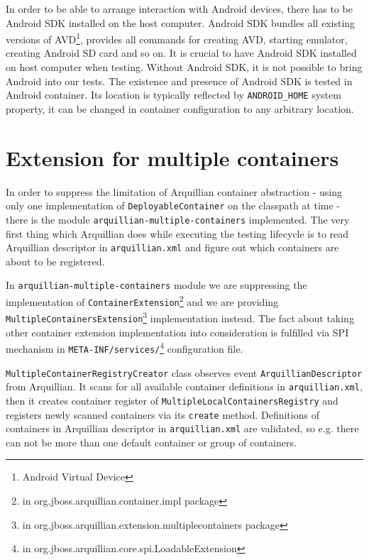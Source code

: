 \documentclass[12pt,final,oneside]{fithesis}
\begin{document}
In order to be able to arrange interaction with Android devices, there has to be Android SDK installed on the host computer. Android SDK bundles all existing versions of AVD\footnote{Android Virtual Device}, provides all commands for creating AVD, starting emulator, creating Android SD card and so on. It is crucial to have Android SDK installed on host computer when testing. Without Android SDK, it is not possible to bring Android into our tests. The existence and presence of Android SDK is tested in Android container. Its location is typically reflected by \texttt{ANDROID\_HOME} system property, it can be changed in container configuration to any arbitrary location.

	\section{Extension for multiple containers}

In order to suppress the limitation of Arquillian container abstraction - using only one implementation of \texttt{DeployableContainer} on the classpath at time - there is the module \texttt{arquillian-multiple-containers} implemented. The very first thing which Arquillian does while executing the testing lifecycle is to read Arquillian descriptor in \texttt{arquillian.xml} and figure out which containers are about to be registered.

In \texttt{arquillian-multiple-containers} module we are suppressing the implementation of \texttt{ContainerExtension}\footnote{in org.jboss.arquillian.container.impl package} and we are providing \texttt{MultipleContainersExtension}\footnote{in org.jboss.arquillian.extension.multiplecontainers package} implementation instead. The fact \linebreak about taking other container extension implementation into consideration is fulfilled via SPI mechanism in \texttt{META-INF/services/}\footnote{in org.jboss.arquillian.core.spi.LoadableExtension} configuration file. 

\texttt{MultipleContainerRegistryCreator} class observes event \linebreak \texttt{ArquillianDescriptor} from Arquillian. It scans for all available container definitions in \texttt{arquillian.xml}, then it creates container register of \texttt{MultipleLocalContainersRegistry} and registers newly scanned containers via its \texttt{create} method. Definitions of containers in Arquillian descriptor in \texttt{arquillian.xml} are validated, so e.g. there can not be more than one default container or group of containers.
\end{document}
